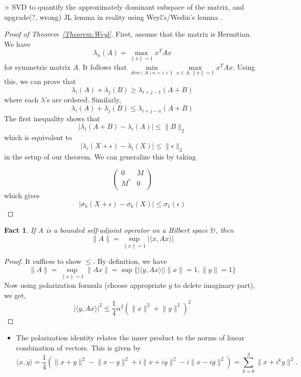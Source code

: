 \documentclass[11pt,reqno]{amsart}
\newtheorem{fact}{Fact}
\theoremstyle{remark}
\begin{document}
\begin{itemize}
 + SVD to quantify the approximately dominant subspace of the matrix, and upgrade(?, wrong)
 JL lemma in reality using Weyl’s/Wedin's lemma .
\begin{proof}[Proof of Theorem~\ref{Theorem:Weyl}]
First, assume that the matrix is Hermitian. We have 
\[
\lambda_n(A)=\max_{\lVert x\rVert=1}x^TAx
\]
for symmetric matrix $A$.
 It follows that $\min\limits_{dim(A)n=i+1}\max\limits_{x\in A,
\lVert x\rVert=1}x^TAx$. Using this, we can prove that
\[
\lambda_i(A)+\lambda_j(B)\geq \lambda_{i+j-1}(A+B)
\] where each $\lambda$'s are ordered.
Similarly,
\[
\lambda_i(A)+\lambda_j(B)\leq \lambda_{i+j-n}(A+B)
\]
The first inequality shows that
\[
\lvert \lambda_i(A+B)-\lambda_i(A)\rvert\leq \lVert B\rVert_2
\]
which is equivalent to
\[
  \lvert \lambda_i(X+\epsilon)-\lambda_i(X)\rvert\leq \lVert \epsilon\rVert_2
\]
in the setup of our theorem.
We can generalize this by taking

\[
\begin{pmatrix}
  0 & M \\
  M^* & 0 \\
\end{pmatrix}
\]
which gives 
\[
\lvert \sigma_k(X+\epsilon)-\sigma_k(X)\rvert\leq\sigma_1(\epsilon)
\]
\end{proof}
\end{itemize}
\begin{fact}
If A is a bounded self-adjoint operator on a Hilbert space $\mathbb{H}$, then 
\[
\lVert A\rVert = \sup\limits_{\lVert x\rVert =1}\lvert\langle x, Ax\rangle\rvert
\]
\end{fact}
\begin{proof}
It suffices to show $\leq$. 
By definition, we have 
\[
\lVert A\rVert = \sup\limits_{\lVert x\rVert=1}\lVert Ax\rVert
=\sup\{\lvert\langle y, Ax\rangle\lvert\rvert\lVert x\rVert=1, \lVert
  y\rVert=1\}
\]
Now using polarization formula (choose appropriate $y$ to delete imaginary part), we get,
\[
\vert\langle y,Ax\rangle\lvert^2\leq \frac 14\alpha^2(\lVert x\rVert^2+\lVert y\rVert^2)^2
\]
\end{proof}
\begin{itemize}
\item The polarization identity relates the inner product to the norms of linear combination of vectors. This
 is given by
\[
\langle x, y\rangle = \frac 14(\lVert x+y\rVert^2-\lVert x-y\rVert^2+i\lVert x+iy\rVert^2-i\lVert x-iy\rVert^2)
=\sum\limits^3_{k=0}\lVert x+i^ky\rVert^2.
\]
\end{itemize}
\end{document}
